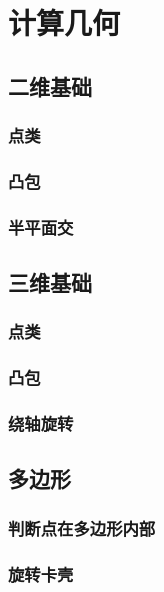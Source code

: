 \documentclass[a4paper]{article}
\newcommand{\cppcode}[1]{
    \inputminted[mathescape]{cpp}{source/#1}
}
\begin{document}
\cppcode{string-manipulation/minimum-circular-representation.cpp}

\section{计算几何}

\subsection{二维基础}

\subsubsection{点类}

\subsubsection{凸包}

\subsubsection{半平面交}

\subsection{三维基础}

\subsubsection{点类}

\subsubsection{凸包}

\subsubsection{绕轴旋转}

\subsection{多边形}

\subsubsection{判断点在多边形内部}

\subsubsection{旋转卡壳}
\end{document}
